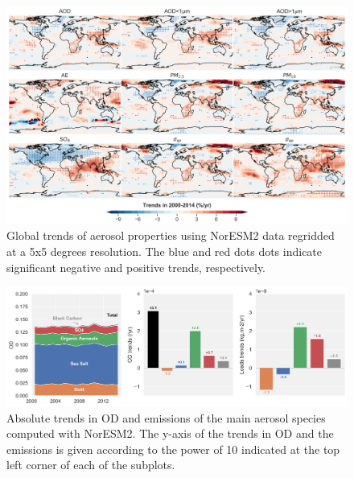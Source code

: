 \documentclass[acp, manuscript]{copernicus}
\begin{document}
\clearpage
\begin{figure}[t]
 \includegraphics[width=16cm]{../scripts/figs/trends_map2.png}
 \caption{Global trends of aerosol properties using NorESM2 data regridded at a 5x5 degrees resolution. The blue and red dots dots indicate significant negative and positive trends, respectively.}
 \label{fig:global_trends}
\end{figure}

\clearpage
\begin{figure}[t]
 \includegraphics[width=16cm]{../scripts/figs/abs_species_trends.png}
 \caption{Absolute trends in OD and emissions of the main aerosol species computed with NorESM2. The y-axis of the trends in OD and the emissions is given according to the power of 10 indicated at the top left corner of each of the subplots.}
 \label{fig:species}
\end{figure}





\end{document}
